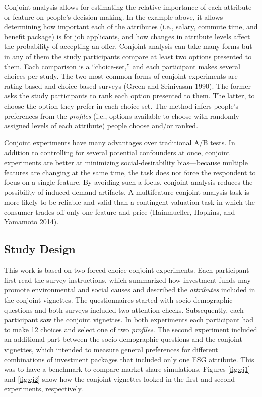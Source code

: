 \documentclass[
  12pt,
]{article}
\begin{document}
Conjoint analysis allows for estimating the relative importance of each attribute or feature on people's decision making. In the example above, it allows determining how important each of the attributes (i.e., salary, commute time, and benefit package) is for job applicants, and how changes in attribute levels affect the probability of accepting an offer. Conjoint analysis can take many forms but in any of them the study participants compare at least two options presented to them. Each comparison is a ``choice-set,'' and each participant makes several choices per study. The two most common forms of conjoint experiments are rating-based and choice-based surveys (Green and Srinivasan 1990). The former asks the study participants to rank each option presented to them. The latter, to choose the option they prefer in each choice-set. The method infers people's preferences from the \emph{profiles} (i.e., options available to choose with randomly assigned levels of each attribute) people choose and/or ranked.

Conjoint experiments have many advantages over traditional A/B tests. In addition to controlling for several potential confounders at once, conjoint experiments are better at minimizing social-desirability bias---because multiple features are changing at the same time, the task does not force the respondent to focus on a single feature. By avoiding such a focus, conjoint analysis reduces the possibility of induced demand artifacts. A multifeature conjoint analysis task is more likely to be reliable and valid than a contingent valuation task in which the consumer trades off only one feature and price (Hainmueller, Hopkins, and Yamamoto 2014).

\hypertarget{study-design}{%
\subsection{Study Design}\label{study-design}}

This work is based on two forced-choice conjoint experiments. Each participant first read the survey instructions, which summarized how investment funds may promote environmental and social causes and described the \emph{attributes} included in the conjoint vignettes. The questionnaires started with socio-demographic questions and both surveys included two attention checks. Subsequently, each participant saw the conjoint vignettes. In both experiments each participant had to make 12 choices and select one of two \emph{profiles}. The second experiment included an additional part between the socio-demographic questions and the conjoint vignettes, which intended to measure general preferences for different combinations of investment packages that included only one ESG attribute. This was to have a benchmark to compare market share simulations. Figures \ref{fig:cj1} and \ref{fig:cj2} show how the conjoint vignettes looked in the first and second experiments, respectively.
\end{document}
